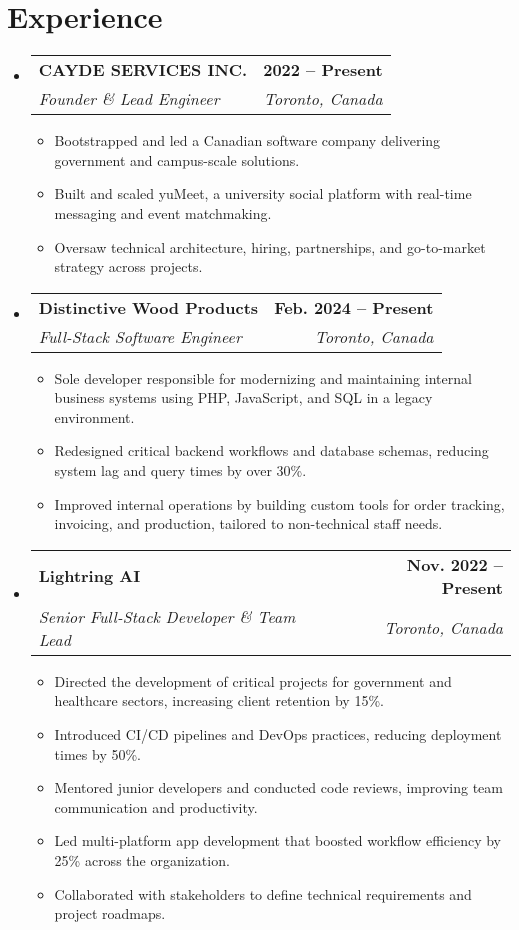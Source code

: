 \documentclass[letterpaper,11pt]{article}
\makeatletter
\newcommand{\resumeItem}[1]{
  \item\small{
    {#1 \vspace{-2pt}}
  }
}
\newcommand{\resumeSubheading}[4]{
  \vspace{-2pt}\item
    \begin{tabular*}{1.0\textwidth}[t]{l@{\extracolsep{\fill}}r}
      \textbf{#1} & \textbf{\small #2} \\
      \textit{\small#3} & \textit{\small #4} \\
    \end{tabular*}\vspace{-7pt}
}
\newcommand{\resumeSubHeadingListStart}{\begin{itemize}[leftmargin=0.0in, label={}]}
\newcommand{\resumeSubHeadingListEnd}{\end{itemize}}
\newcommand{\resumeItemListStart}{\begin{itemize}}
\newcommand{\resumeItemListEnd}{\end{itemize}\vspace{-5pt}}
\makeatother
\begin{document}
\section{Experience}
  \resumeSubHeadingListStart
    \resumeSubheading
      {CAYDE SERVICES INC.}{2022 -- Present}
      {Founder \& Lead Engineer}{Toronto, Canada}
      \resumeItemListStart
        \resumeItem{Bootstrapped and led a Canadian software company delivering government and campus-scale solutions.}
        \resumeItem{Built and scaled yuMeet, a university social platform with real-time messaging and event matchmaking.}
        \resumeItem{Oversaw technical architecture, hiring, partnerships, and go-to-market strategy across projects.}
      \resumeItemListEnd

      \resumeSubheading
      {Distinctive Wood Products}{Feb. 2024 -- Present}
      {Full-Stack Software Engineer}{Toronto, Canada}
      \resumeItemListStart
        \resumeItem{Sole developer responsible for modernizing and maintaining internal business systems using PHP, JavaScript, and SQL in a legacy environment.}
        \resumeItem{Redesigned critical backend workflows and database schemas, reducing system lag and query times by over 30\%.}
        \resumeItem{Improved internal operations by building custom tools for order tracking, invoicing, and production, tailored to non-technical staff needs.}
      \resumeItemListEnd
    

    \resumeSubheading
      {Lightring AI}{Nov. 2022 -- Present}
      {Senior Full-Stack Developer \& Team Lead}{Toronto, Canada}
      \resumeItemListStart
        \resumeItem{Directed the development of critical projects for government and healthcare sectors, increasing client retention by 15\%.}
        \resumeItem{Introduced CI/CD pipelines and DevOps practices, reducing deployment times by 50\%.}
        \resumeItem{Mentored junior developers and conducted code reviews, improving team communication and productivity.}
        \resumeItem{Led multi-platform app development that boosted workflow efficiency by 25\% across the organization.}
        \resumeItem{Collaborated with stakeholders to define technical requirements and project roadmaps.}
      \resumeItemListEnd

  \resumeSubHeadingListEnd
\vspace{-16pt}

\end{document}
